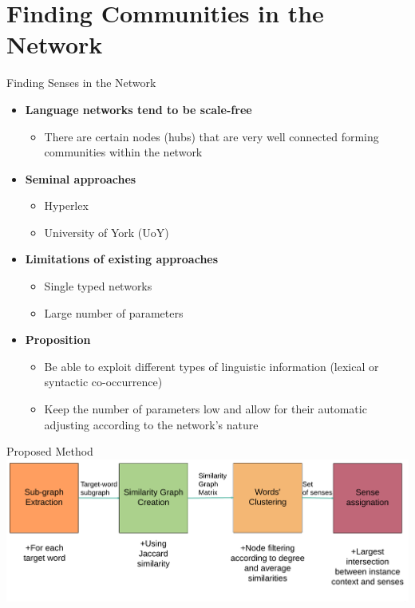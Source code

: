 \documentclass[10pt,xcolor=table]{beamer}
\begin{document}
\section[Contributions in Detail]{Finding Communities in the Network}


\begin{frame}{Finding Senses in the Network}

	\begin{itemize}[<+- | alert@+>]
		\item \large \textbf{Language networks tend to be scale-free}	
			\begin{itemize}
				\item There are certain nodes (hubs) that are very well connected forming communities within the network
			\end{itemize}

		\item \large \textbf{Seminal approaches}
			\begin{itemize}
				\item Hyperlex \cite{2004.Veronis}
				\item University of York (UoY) \cite{2007.Klapaftis.UOY}
			\end{itemize}
		\item \textbf{Limitations of existing approaches}
		\begin{itemize}
			\item Single typed networks
			\item Large number of parameters
		\end{itemize}
		\item \textbf{Proposition}
		\begin{itemize}
				\item Be able to exploit different types of linguistic information (lexical or syntactic co-occurrence)
				\item Keep  the number of parameters low and allow for their automatic adjusting according to the network's nature
		
		\end{itemize}
\end{itemize}
\vspace{\textheight}	
\end{frame}
\begin{frame}{Proposed Method}
  \centering
  \includegraphics[width=1\linewidth]{img/wsd_wsi.png}

\end{frame}
\end{document}
